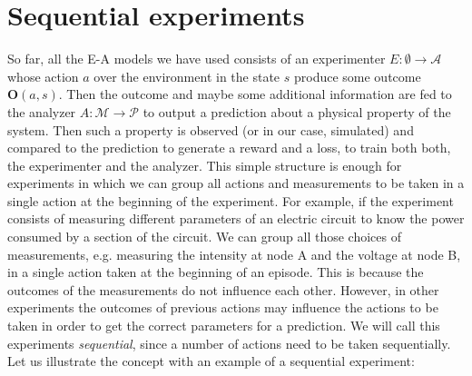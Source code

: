 \documentclass[11pt,a4paper,twoside]{report}
\newcommand{\+}{\textnormal{+} }
\theoremstyle{definition}
\numberwithin{equation}{chapter}
\begin{document}
\section{Sequential experiments}

So far, all the E-A models we have used consists of an experimenter $E:\emptyset
\rightarrow \mathcal{A}$ whose action $a$ over the environment in the state $s$
produce some outcome $\textbf{O}(a,s)$. Then the outcome and maybe some
additional information are fed to the analyzer $A:\mathcal{M} \rightarrow
\mathcal{P}$ to output a prediction about a physical property of the system.
Then such a property is observed (or in our case, simulated) and compared to the
prediction to generate a reward and a loss, to train both both, the experimenter
and the analyzer. This simple structure is enough for experiments in which we
can group all actions and measurements to be taken in a single action at the
beginning of the experiment. For example, if the experiment consists of
measuring different parameters of an electric circuit to know the power consumed
by a section of the circuit. We can group all those choices of measurements,
e.g. measuring the intensity at node A and the voltage at node B, in a single
action taken at the beginning of an episode. This is because the outcomes of the
measurements do not influence each other. However, in other experiments the
outcomes of previous actions may influence the actions to be taken in order to
get the correct parameters for a prediction. We will call this experiments
\textit{sequential}, since a number of actions need to be taken sequentially.
Let us illustrate the concept with an example of a sequential experiment:
\end{document}
